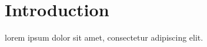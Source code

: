 \section{Introduction} \label{sec:introduction}
lorem ipsum dolor sit amet, consectetur adipiscing elit.